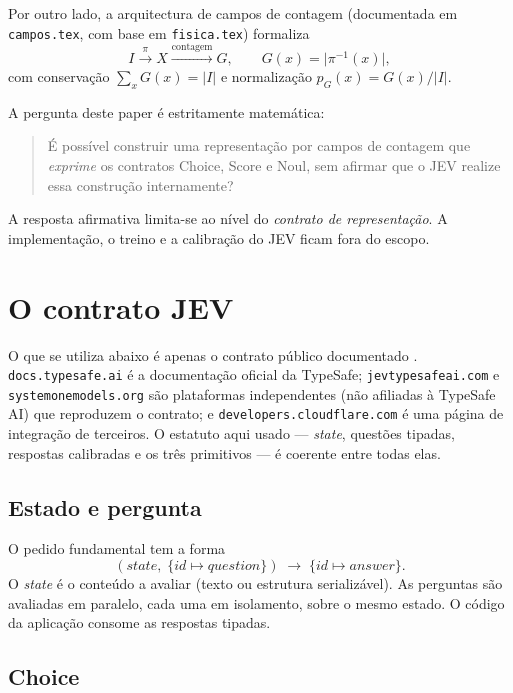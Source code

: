 \documentclass[11pt,a4paper]{article}
\begin{document}
Por outro lado, a arquitectura de campos de contagem (documentada em
\texttt{campos.tex}, com base em \texttt{fisica.tex}) formaliza
\[
I\xrightarrow{\pi}X\xrightarrow{\text{contagem}}G,
\qquad
G(x)=\lvert\pi^{-1}(x)\rvert,
\]
com conservação \(\sum_x G(x)=\lvert I\rvert\) e normalização
\(p_G(x)=G(x)/\lvert I\rvert\).

A pergunta deste paper é estritamente matemática:
\begin{quote}
É possível construir uma representação por campos de contagem que
\emph{exprime} os contratos Choice, Score e Noul, sem afirmar que o JEV
realize essa construção internamente?
\end{quote}

A resposta afirmativa limita-se ao nível do \emph{contrato de representação}.
A implementação, o treino e a calibração do JEV ficam fora do escopo.

\section{O contrato JEV}

O que se utiliza abaixo é apenas o contrato público documentado
\cite{typesafe-docs,jev-docs,systemone-primitives,cloudflare-jev}.
\texttt{docs.typesafe.ai} é a documentação oficial da TypeSafe;
\texttt{jevtypesafeai.com} e \texttt{systemonemodels.org} são plataformas
independentes (não afiliadas à TypeSafe AI) que reproduzem o contrato; e
\texttt{developers.cloudflare.com} é uma página de integração de terceiros.
O estatuto aqui usado --- \emph{state}, questões tipadas, respostas
calibradas e os três primitivos --- é coerente entre todas elas.

\subsection{Estado e pergunta}

O pedido fundamental tem a forma
\[
(\textit{state},\;\{\textit{id}\mapsto\textit{question}\})
\;\longrightarrow\;
\{\textit{id}\mapsto\textit{answer}\}.
\]
O \emph{state} é o conteúdo a avaliar (texto ou estrutura serializável).
As perguntas são avaliadas em paralelo, cada uma em isolamento, sobre o mesmo
estado. O código da aplicação consome as respostas tipadas.

\subsection{Choice}
\end{document}
